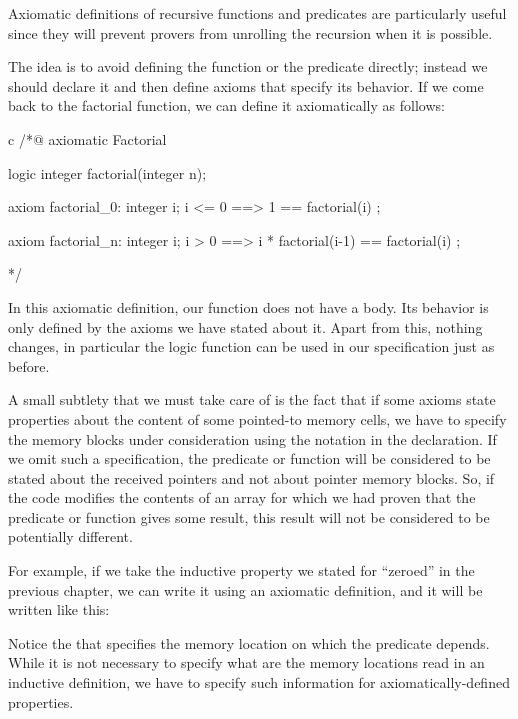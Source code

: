 

Axiomatic definitions of recursive functions and predicates are
particularly useful since they will prevent provers from unrolling the
recursion when it is possible.


The idea is to avoid defining the function or the predicate
directly; instead we should declare it and then define axioms that specify its
behavior. If we come back to the factorial function, we can define it
axiomatically as follows:


\begin{CodeBlock}{c}
/*@
  axiomatic Factorial{
    logic integer factorial(integer n);

    axiom factorial_0:
      \forall integer i; i <= 0 ==> 1 == factorial(i) ;

    axiom factorial_n:
      \forall integer i; i > 0 ==> i * factorial(i-1) == factorial(i) ;
  }
*/
\end{CodeBlock}


In this axiomatic definition, our function does not have a body. Its
behavior is only defined by the axioms we have stated about it.
Apart from this, nothing changes, in particular the logic function can
be used in our specification just as before.


A small subtlety that we must take care of is the fact that if some
axioms state properties about the content of some pointed-to memory cells,
we have to specify the memory blocks under consideration using the 
notation in the declaration. If we omit such a specification, the
predicate or function will be considered to be stated about the received
pointers and not about pointer memory blocks. So, if the code modifies
the contents of an array for which we had proven that the predicate or
function gives some result, this result will not be considered to be
potentially different.


For example, if we take the inductive property we stated for ``zeroed''
in the previous chapter, we can write it using an axiomatic definition, and it
will be written like this:




Notice the  that specifies the memory location
on which the predicate depends. While it is not necessary to specify what are
the memory locations read in an inductive definition, we have to specify such
information for axiomatically-defined properties.


